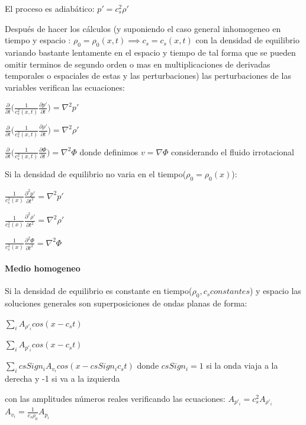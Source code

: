 \documentclass{article}
\begin{document}
\begin{description}  
\item El proceso es adiabático: $p\prime = c_s^{2} \rho\prime$

\item Después de hacer los cálculos (y suponiendo el caso general inhomogeneo en tiempo y espacio : $\rho_0 = \rho_0(x,t) \implies c_s = c_s(x,t)$ con la densidad de equilibrio variando bastante lentamente en el espacio y tiempo de tal forma que se pueden omitir terminos de segundo orden o mas en multiplicaciones de derivadas temporales o espaciales de estas y las perturbaciones) las perturbaciones de las variables verifican las ecuaciones: 

\item $\frac{\partial}{\partial t} \big(\frac{1}{c_s^{2}(x,t)} \frac{\partial p\prime}{\partial t}\big) = \nabla^{2} p\prime    $
\item $\frac{\partial}{\partial t} \big(\frac{1}{c_s^{2}(x,t)} \frac{\partial \rho\prime}{\partial t}\big) = \nabla^{2} \rho\prime    $
\item $\frac{\partial}{\partial t} \big(\frac{1}{c_s^{2}(x,t)} \frac{\partial \Phi}{\partial t}\big) = \nabla^{2} \Phi $ donde definimos  $v = \nabla \Phi$ considerando el fluido irrotacional
\item Si la densidad de equilibrio no varia en el tiempo($\rho_0 = \rho_0(x)$):
\item $\frac{1}{c_s^{2}(x)} \frac{\partial^{2} p\prime}{\partial t^{2}} = \nabla^{2} p\prime    $
\item $\frac{1}{c_s^{2}(x)} \frac{\partial^{2} \rho\prime}{\partial t^{2}} = \nabla^{2} \rho\prime    $
\item $\frac{1}{c_s^{2}(x)} \frac{\partial^{2} \Phi}{\partial t^{2}} = \nabla^{2} \Phi    $
\end{description}  

\paragraph{Medio homogeneo}

\begin{description}  
\item Si la densidad de equilibrio es constante en tiempo($\rho_0, c_s constantes$) y espacio las soluciones generales son superposiciones de ondas planas de forma:
\item $ \sum_{i} A_{\rho\prime_i} cos (x - c_s t) $
\item $ \sum_{i} A_{p\prime_i} cos (x - c_s t) $
\item $ \sum_{i} csSign_i A_{v_i} cos (x - csSign_i c_s t) $ donde $csSign_i = 1 $ si la onda viaja a la derecha y -1 si va a la izquierda
\item con las amplitudes números reales verificando las ecuaciones:
$A_{p\prime_i} = c_s^{2} A_{\rho\prime_i}$
$A_{v_i} = \frac{1}{c_s \rho_0} A_{p_i}$
\end{description}  
\end{document}
